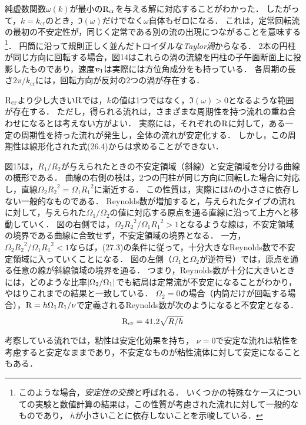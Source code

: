 純虚数関数$\omega(k)$が最小の$\mathrm{R}_{\mathrm{cr}}$を与える解に対応することがわかった．
したがって，$k=k_\mathrm{cr}$のとき，$\Im(\omega)$だけでなく$\omega$自体もゼロになる．
これは，定常回転流の最初の不安定性が，同じく定常である別の流の出現につながることを意味する
\footnote{このような場合，\emph{安定性の交換}と呼ばれる．
いくつかの特殊なケースについての実験と数値計算の結果は，この性質が考慮された流れに対して一般的なものであり，
$h$が小さいことに依存しないことを示唆している．}．
円筒に沿って規則正しく並んだトロイダルな\emph{Taylor渦}からなる．
2本の円柱が同じ方向に回転する場合，図14はこれらの渦の流線を円柱の子午面断面上に投影したものであり，速度$\vb*{v}_1$は実際には方位角成分をも持っている．
各周期の長さ$2\pi/k_\mathrm{cr}$には，回転方向が反対の2つの渦が存在する．



$\mathrm{R}_{\mathrm{cr}}$より少し大きい$\mathrm{R}$では，$k$の値は1つではなく，$\Im(\omega)>0$となるような範囲が存在する．
ただし，得られる流れは，さまざまな周期性を持つ流れの重ね合わせになるとは考えない方がよい．
実際には，それぞれの$\mathrm{R}$に対して，ある一定の周期性を持った流れが発生し，全体の流れが安定化する．
しかし，この周期性は線形化された式(26.4)からは求めることができない．



図15は，$R_1/R_2$が与えられたときの不安定領域（斜線）と安定領域を分ける曲線の概形である．
曲線の右側の枝は，2つの円柱が同じ方向に回転した場合に対応し，直線$\Omega_2{R_2}^2=\Omega_1{R_1}^2$に漸近する．
この性質は，実際には$h$の小ささに依存しない一般的なものである．
Reynolds数が増加すると，与えられたタイプの流れに対して，与えられた$\Omega_1/\Omega_2$の値に対応する原点を通る直線に沿って上方へと移動していく．
図の右側では，$\Omega_2{R_2}^2/\Omega_1{R_1}^2>1$となるような線は，不安定領域の境界である曲線に合致せず，不安定領域の境界となる．
一方，$\Omega_2{R_2}^2/\Omega_1{R_1}^2<1$ならば，(27.3)の条件に従って，十分大きなReynolds数で不安定領域に入っていくことになる．
図の左側（$\Omega_1$と$\Omega_2$が逆符号）では，原点を通る任意の線が斜線領域の境界を通る．
つまり，Reynolds数が十分に大きいときには，どのような比率$\abs{\Omega_2/\Omega_1}$でも結局は定常流が不安定になることがわかり，やはりこれまでの結果と一致している．
$\Omega_2=0$の場合（内筒だけが回転する場合），$\mathrm{R}=h\Omega_1R_1/\nu$で定義されるReynolds数が次のようになると不安定となる．
\begin{equation}
    \mathrm{R}_{\mathrm{cr}} = 41.2 \sqrt{R/h}
\end{equation}



考察している流れでは，粘性は安定化効果を持ち，
$\nu=0$で安定な流れは粘性を考慮すると安定なままであり，不安定なものが粘性流体に対して安定になることもある．


